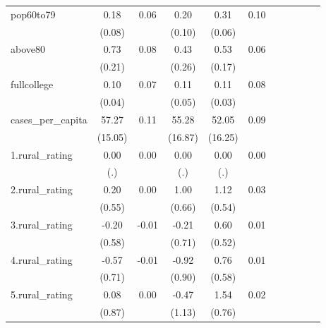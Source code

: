 {\begin{tabular}{l*{5}{cc}}
pop60to79   &        0.18\sym{*}  &        0.06&        0.20\sym{*}  &        0.31\sym{***}&        0.10\\
            &      (0.08)         &            &      (0.10)         &      (0.06)         &            \\
above80     &        0.73\sym{***}&        0.08&        0.43         &        0.53\sym{**} &        0.06\\
            &      (0.21)         &            &      (0.26)         &      (0.17)         &            \\
fullcollege &        0.10\sym{*}  &        0.07&        0.11\sym{*}  &        0.11\sym{***}&        0.08\\
            &      (0.04)         &            &      (0.05)         &      (0.03)         &            \\
cases\_per\_capita&       57.27\sym{***}&        0.11&       55.28\sym{**} &       52.05\sym{**} &        0.09\\
            &     (15.05)         &            &     (16.87)         &     (16.25)         &            \\
1.rural\_rating&        0.00         &        0.00&        0.00         &        0.00         &        0.00\\
            &         (.)         &            &         (.)         &         (.)         &            \\
2.rural\_rating&        0.20         &        0.00&        1.00         &        1.12\sym{*}  &        0.03\\
            &      (0.55)         &            &      (0.66)         &      (0.54)         &            \\
3.rural\_rating&       -0.20         &       -0.01&       -0.21         &        0.60         &        0.01\\
            &      (0.58)         &            &      (0.71)         &      (0.52)         &            \\
4.rural\_rating&       -0.57         &       -0.01&       -0.92         &        0.76         &        0.01\\
            &      (0.71)         &            &      (0.90)         &      (0.58)         &            \\
5.rural\_rating&        0.08         &        0.00&       -0.47         &        1.54\sym{*}  &        0.02\\
            &      (0.87)         &            &      (1.13)         &      (0.76)         &            \\

\end{tabular}}
